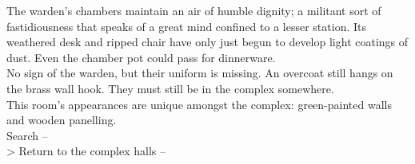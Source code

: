 The warden's chambers maintain an air of humble dignity; a militant sort of fastidiousness that speaks of a great mind confined to a lesser station. Its weathered desk and ripped chair have only just begun to develop light coatings of dust. Even the chamber pot could pass for dinnerware.\\

No sign of the warden, but their uniform is missing. An overcoat still hangs on the brass wall hook. They must still be in the complex somewhere.\\

This room's appearances are unique amongst the complex: green-painted walls and wooden panelling.\\

 Search -- \\
> Return to the complex halls -- 